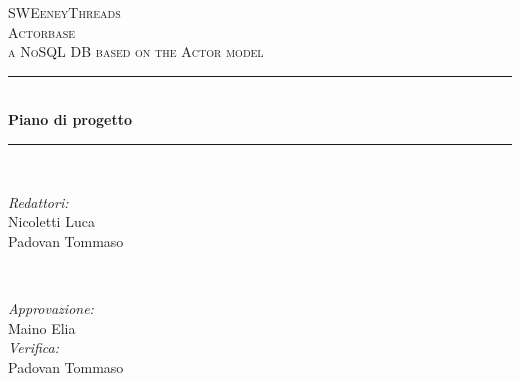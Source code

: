 \documentclass[a4paper]{article}
\begin{document}
	\begin{titlepage}
		\newcommand{\HRule}{\rule{\linewidth}{0.5mm}} 
		\center  
		
		\textsc{\LARGE SWEeneyThreads}\\[1.5cm] 
		\textsc{\Large Actorbase}\\[0.5cm] 
		\textsc{\large a NoSQL DB based on the Actor model}\\[0.5cm]
		
		
		\HRule \\[0.4cm]
		{ \huge \bfseries Piano di progetto}\\[0.4cm] 
		\HRule \\[1.5cm]
		
		\begin{minipage}{0.4\textwidth}
			\begin{flushleft} \large
				\emph{Redattori:}\\
				Nicoletti Luca\\
				Padovan Tommaso \\
			\end{flushleft}
		\end{minipage}
		~
		\begin{minipage}{0.4\textwidth}
			\begin{flushright} \large
				\emph{Approvazione:} \\
                Maino Elia \\
				\emph{Verifica:} \\
                Padovan Tommaso
			\end{flushright}
		\end{minipage}
		

\end{titlepage}
\end{document}
